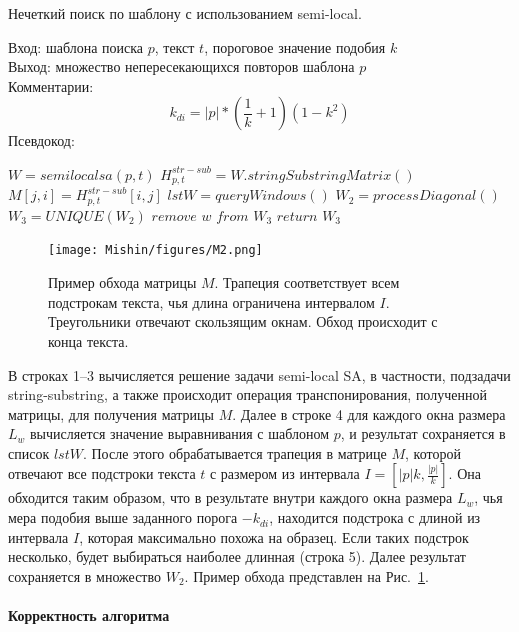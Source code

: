 \begin{algorithm}[t!]
\caption{Нечеткий поиск по шаблону с использованием {semi-local}.}\label{alg:patternMathing1}
Вход: шаблона поиска $p$, текст $t$, пороговое значение подобия $k$\\
Выход: множество непересекающихся повторов шаблона $p$\\
Комментарии:
\begin{equation}
    k_{di}=|p|*(\dfrac{1}{k}+1)(1-k^2)
\end{equation}
Псевдокод:
\begin{algorithmic}[1]
\State $W = semilocalsa(p,t)$
\State $ H^{str-sub}_{p,t} =  W.stringSubstringMatrix()$
\State $ M[j,i] = H^{str-sub}_{p,t}[i,j] $
\State $lstW = queryWindows()$
\State $W_2 = processDiagonal()$
\State $W_3 = UNIQUE(W_2)$
\State $remove$ $w$ $from$ $W_3$
\EndIf
\EndFor
\State $return$ $W_3$

\end{algorithmic}
\end{algorithm}

\begin{figure}[t!]
\centering
    \texttt{[image: Mishin/figures/M2.png]}
    \caption{Пример обхода матрицы $M$. Трапеция соответствует всем подстрокам текста, чья длина ограничена интервалом $I$. Треугольники отвечают скользящим окнам.
    Обход происходит с конца текста.
    }\label{passage}
\end{figure}

В строках 1--3 вычисляется решение задачи {semi-local SA}, в частности, подзадачи string-substring, а также происходит операция транспонирования, полученной матрицы, для получения матрицы $M$.
Далее в строке 4 для каждого окна размера $L_{w}$ вычисляется значение выравнивания с шаблоном $p$, и результат сохраняется в список $lstW$.
После этого обрабатывается трапеция в матрице $M$, которой отвечают все подстроки текста $t$ с размером из интервала $I=[|p|k,\frac{|p|}{k}]$.
Она обходится таким образом, что в результате внутри каждого окна размера $L_{w}$, чья  мера подобия выше заданного порога $-k_{di}$, находится подстрока с длиной из интервала $I$, которая максимально похожа на образец.
Если таких подстрок несколько, будет выбираться наиболее длинная (строка 5).
Далее результат сохраняется в множество $W_{2}$.
Пример обхода представлен на Рис.~\ref{passage}.

\paragraph*{Корректность алгоритма}\mbox{}

